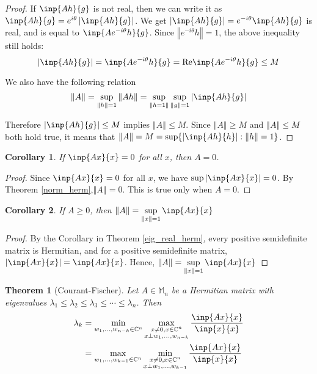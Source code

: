 \documentclass[twofold]{article}
\newcommand*\norm[1]{\left \Vert #1 \right\Vert}
\newcommand*\abs[1]{\left \vert #1 \right\vert}
\theoremstyle{plain}
\newtheorem{theorem}{Theorem}
\newtheorem*{corollary}{Corollary}
\theoremstyle{definition}
\theoremstyle{remark}
\begin{document}
\begin{proof}
If \(\inp{Ah}{g}\) is not real, then we can write it as  \(\inp{Ah}{g} = e^{i \theta} \abs{\inp{Ah}{g}}\). We get \(\abs{\inp{Ah}{g}} = e^{-i \theta} \inp{Ah}{g}\) is real, and is equal to \(\inp{A e^{- i\theta}h}{g}\). Since \(\norm{e^{-i\theta} h}= 1\), the above inequality still holds:
 \[\abs{\inp{Ah}{g}} = \inp{Ae^{-i\theta}h}{g} =  \text{Re} \inp{Ae^{-i\theta}h}{g} \le M\]

We also have the following relation
 \[\norm{A} = \sup_{\norm{h} =1} \norm{Ah} = \sup_{\norm{h = 1}} \sup_{\norm{g} = 1} \abs{\inp{Ah}{g}} \]

Therefore \(\abs{\inp{Ah}{g}} \le M\)  implies \(\norm{A} \le M\). Since \(\norm{A} \ge M\) and \(\norm{A} \le M\) both hold true, it means that \(\norm{A} = M = \sup \{ \abs{\inp{Ah}{h}} : \norm{h} = 1 \}\).
\end{proof}

\begin{corollary} If \(\inp{Ax}{x} = 0\) for all \(x\), then \(A = 0\).\end{corollary}
\begin{proof} Since \(\inp{Ax}{x} = 0\) for all \(x\), we have \(\sup \abs{\inp{Ax}{x}} = 0\). By Theorem \ref{norm_herm},\( \norm{A} = 0 \). This is true only when \(A = 0\).\end{proof}


\begin{corollary} If \(A \ge 0\), then \(\displaystyle \norm{A} = \sup _{\norm{x} = 1} \inp{Ax}{x}\) \end{corollary}
\begin{proof}   By the Corollary in Theorem \ref{eig_real_herm}, every positive semidefinite matrix is Hermitian, and for a positive semidefinite matrix, \(\abs{\inp{Ax}{x}} = \inp{Ax}{x}\). Hence, \(\norm{A} = \displaystyle \sup_{\norm{x} = 1} \inp{Ax}{x}\) \end{proof}



\begin{theorem}[Courant-Fischer] Let \(A \in \mathbb{M}_n\) be a Hermitian matrix with eigenvalues \(\lambda_1 \le \lambda_2 \le \lambda_3 \le \cdots \le \lambda_n\).  Then 
\begin{equation*}\begin{split}
 \lambda_k &= \min_{w_1, \ldots , w_{n-k} \in \mathbb{C}^n} \max_{\substack{x \neq 0, x\in \mathbb{C}^n \\ x \perp w_1, \ldots , w_{n-k}}} \frac{\inp{Ax}{x}}{\inp{x}{x}} \\
& = \max_{w_1, \ldots , w_{k -1} \in \mathbb{C}^n} \min_{\substack{x \neq 0, x\in \mathbb{C}^n \\ x \perp w_1, \ldots , w_{k - 1}}} \frac{\inp{Ax}{x}}{\inp{x}{x}}
\end{split} \end{equation*}
 \end{theorem}
\end{document}
